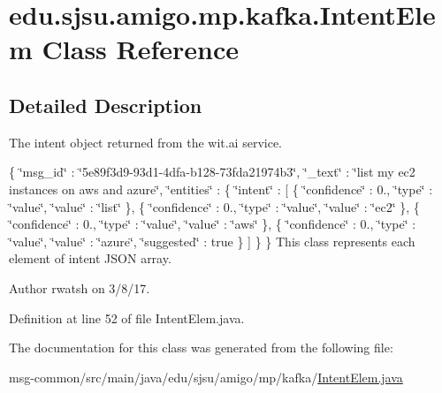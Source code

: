 \hypertarget{classedu_1_1sjsu_1_1amigo_1_1mp_1_1kafka_1_1_intent_elem}{}\section{edu.\+sjsu.\+amigo.\+mp.\+kafka.\+Intent\+Elem Class Reference}
\label{classedu_1_1sjsu_1_1amigo_1_1mp_1_1kafka_1_1_intent_elem}


\subsection{Detailed Description}
The intent object returned from the wit.\+ai service.

\{ \char`\"{}msg\+\_\+id\char`\"{} \+: \char`\"{}5e89f3d9-\/93d1-\/4dfa-\/b128-\/73fda21974b3\char`\"{}, \char`\"{}\+\_\+text\char`\"{} \+: \char`\"{}list my ec2 instances on aws and azure\char`\"{}, \char`\"{}entities\char`\"{} \+: \{ \char`\"{}intent\char`\"{} \+: \mbox{[} \{ \char`\"{}confidence\char`\"{} \+: 0., \char`\"{}type\char`\"{} \+: \char`\"{}value\char`\"{}, \char`\"{}value\char`\"{} \+: \char`\"{}list\char`\"{} \}, \{ \char`\"{}confidence\char`\"{} \+: 0., \char`\"{}type\char`\"{} \+: \char`\"{}value\char`\"{}, \char`\"{}value\char`\"{} \+: \char`\"{}ec2\char`\"{} \}, \{ \char`\"{}confidence\char`\"{} \+: 0., \char`\"{}type\char`\"{} \+: \char`\"{}value\char`\"{}, \char`\"{}value\char`\"{} \+: \char`\"{}aws\char`\"{} \}, \{ \char`\"{}confidence\char`\"{} \+: 0., \char`\"{}type\char`\"{} \+: \char`\"{}value\char`\"{}, \char`\"{}value\char`\"{} \+: \char`\"{}azure\char`\"{}, \char`\"{}suggested\char`\"{} \+: true \} \mbox{]} \} \} This class represents each element of intent J\+S\+ON array.

\begin{DoxyAuthor}{Author}
rwatsh on 3/8/17. 
\end{DoxyAuthor}


Definition at line 52 of file Intent\+Elem.\+java.



The documentation for this class was generated from the following file\+:\begin{DoxyCompactItemize}
\item 
msg-\/common/src/main/java/edu/sjsu/amigo/mp/kafka/\hyperlink{_intent_elem_8java}{Intent\+Elem.\+java}\end{DoxyCompactItemize}

